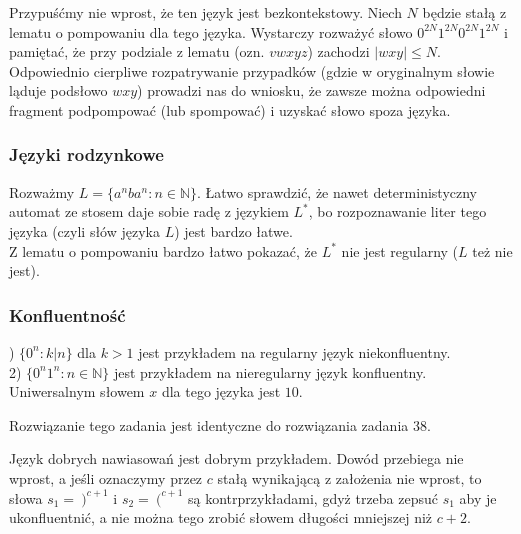 \documentclass[a4paper,11pt]{article}
\newenvironment{zadanie}[1]
  {\renewcommand\theinnercustomthm{#1}\innercustomthm}
  {\endinnercustomthm}
\begin{document}
\begin{zadanie}{63}
\end{zadanie}
Przypuśćmy nie wprost, że ten język jest bezkontekstowy. Niech $N$ będzie stałą z lematu o pompowaniu dla tego języka. 
Wystarczy rozważyć słowo $0^{2N}1^{2N}0^{2N}1^{2N}$ i pamiętać, że przy podziale z lematu (ozn. $vwxyz$) zachodzi
$|wxy| \leqslant N$. Odpowiednio cierpliwe rozpatrywanie przypadków (gdzie w oryginalnym słowie ląduje podsłowo $wxy$)
prowadzi nas do wniosku, że zawsze można odpowiedni fragment podpompować (lub spompować) i uzyskać słowo spoza języka.


\subsubsection{Języki rodzynkowe}

\begin{zadanie}{71}
\end{zadanie}
Rozważmy $L = \{ a^nba^n : n \in \mathbb{N}\}$. Łatwo sprawdzić, że nawet deterministyczny automat ze stosem daje sobie radę
z językiem $L^*$, bo rozpoznawanie liter tego języka (czyli słów języka $L$) jest bardzo łatwe. \\
Z lematu o pompowaniu bardzo łatwo pokazać, że $L^*$ nie jest regularny ($L$ też nie jest).


\subsubsection{Konfluentność}

\begin{zadanie}{74}
\end{zadanie}
1) $\{ 0^n : k|n \}$ dla $k>1$ jest przykładem na regularny język niekonfluentny. \\
2) $\{ 0^n1^n : n \in \mathbb{N} \}$ jest przykładem na nieregularny język konfluentny. Uniwersalnym słowem $x$ dla tego języka
jest $10$.

\begin{zadanie}{75}
\end{zadanie}
Rozwiązanie tego zadania jest identyczne do rozwiązania zadania 38.

\begin{zadanie}{76}
\end{zadanie}
Język dobrych nawiasowań jest dobrym przykładem. Dowód przebiega nie wprost, a jeśli oznaczymy przez $c$ stałą wynikającą
z założenia nie wprost, to słowa $s_1 = \ )^{c+1}$ i $s_2 = \ (^{c+1}$ są kontrprzykładami, gdyż trzeba zepsuć $s_1$ aby je
ukonfluentnić, a nie można tego zrobić słowem długości mniejszej niż $c+2$.
\end{document}
